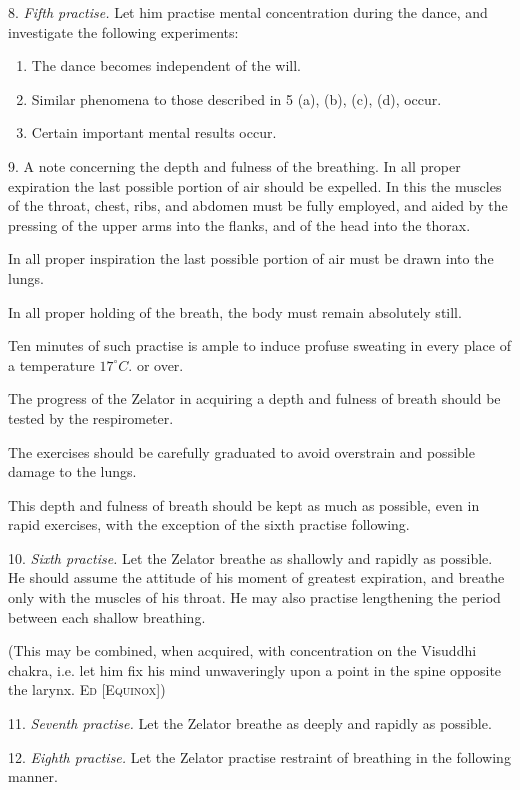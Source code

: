 8. \textit{Fifth practise.} Let him practise mental concentration during the dance, and investigate the following experiments:

\begin{enumerate}[label=(\alph*)]
\item The dance becomes independent of the will.
\item Similar phenomena to those described in 5 (a), (b), (c), (d), occur.
\item Certain important mental results occur.
\end{enumerate}

9. A note concerning the depth and fulness of the breathing. In all proper expiration the last possible portion of air should be expelled. In this the muscles of the throat, chest, ribs, and abdomen must be fully employed, and aided by the pressing of the upper arms into the flanks, and of the head into the thorax.

In all proper inspiration the last possible portion of air must be drawn into the lungs.

In all proper holding of the breath, the body must remain absolutely still.

Ten minutes of such practise is ample to induce profuse sweating in every place of a temperature $17^{\circ}C.$ or over.

The progress of the Zelator in acquiring a depth and fulness of breath should be tested by the respirometer.

The exercises should be carefully graduated to avoid overstrain and possible damage to the lungs.

This depth and fulness of breath should be kept as much as possible, even in rapid exercises, with the exception of the sixth practise following.

10. \textit{Sixth practise.} Let the Zelator breathe as shallowly and rapidly as possible. He should assume the attitude of his moment of greatest expiration, and breathe only with the muscles of his throat. He may also practise lengthening the period between each shallow breathing.

(This may be combined, when acquired, with concentration on the Visuddhi chakra, i.e. let him fix his mind unwaveringly upon a point in the spine opposite the larynx. \textsc{Ed [Equinox]})

11. \textit{Seventh practise.} Let the Zelator breathe as deeply and rapidly as possible.

12. \textit{Eighth practise.} Let the Zelator practise restraint of breathing in the following manner.

